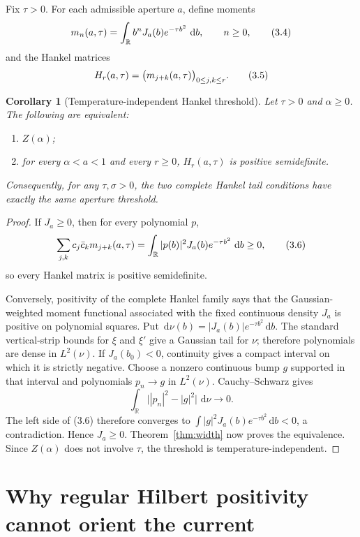 \documentclass[11pt]{article}
\newtheorem{corollary}[theorem]{Corollary}
\theoremstyle{definition}
\theoremstyle{remark}
\newcommand{\R}{\mathbb R}
\newcommand{\dd}{\,\mathrm d}
\newcommand{\eqtag}[1]{\qquad\text{\upshape(#1)}}
\begin{document}
Fix \(\tau>0\).  For each admissible aperture \(a\), define moments
\[
  m_n(a,\tau)
  =\int_{\R}b^nJ_a(b)e^{-\tau b^2}\,\dd b,\qquad n\geq0,            \eqtag{3.4}
\]
and the Hankel matrices
\[
  H_r(a,\tau)=\big(m_{j+k}(a,\tau)\big)_{0\leq j,k\leq r}.          \eqtag{3.5}
\]

\begin{corollary}[Temperature-independent Hankel threshold]
\label{cor:hankel}
Let \(\tau>0\) and \(\alpha\geq0\).  The following are equivalent:
\begin{enumerate}[label=\textup{(\roman*)}]
\item \(Z(\alpha)\);
\item for every \(\alpha<a<1\) and every \(r\geq0\),
      \(H_r(a,\tau)\) is positive semidefinite.
\end{enumerate}
Consequently, for any \(\tau,\sigma>0\), the two complete Hankel
tail conditions have exactly the same aperture threshold.
\end{corollary}

\begin{proof}
If \(J_a\geq0\), then for every polynomial \(p\),
\[
 \sum_{j,k}c_j\bar c_km_{j+k}(a,\tau)
 =\int_{\R}|p(b)|^2J_a(b)e^{-\tau b^2}\,\dd b\geq0,                \eqtag{3.6}
\]
so every Hankel matrix is positive semidefinite.

Conversely, positivity of the complete Hankel family says that the
Gaussian-weighted moment functional associated with the fixed continuous
density \(J_a\) is positive on polynomial squares.  Put
\(\dd\nu(b)=|J_a(b)|e^{-\tau b^2}\dd b\).  The standard vertical-strip
bounds for \(\xi\) and \(\xi'\) give a Gaussian tail for \(\nu\);
therefore polynomials are dense in \(L^2(\nu)\).  If \(J_a(b_0)<0\),
continuity gives a compact interval on which it is strictly negative.
Choose a nonzero continuous bump \(g\) supported in that interval and
polynomials \(p_n\to g\) in \(L^2(\nu)\).  Cauchy--Schwarz gives
\[
 \int_{\R}\bigl||p_n|^2-|g|^2\bigr|\,\dd\nu\longrightarrow0.
\]
The left side of (3.6) therefore converges to
\(\int |g|^2J_a(b)e^{-\tau b^2}\dd b<0\), a contradiction.  Hence
\(J_a\geq0\).
Theorem~\ref{thm:width} now proves the equivalence.  Since \(Z(\alpha)\)
does not involve \(\tau\), the threshold is temperature-independent.
\end{proof}

\section{Why regular Hilbert positivity cannot orient the current}
\end{document}
